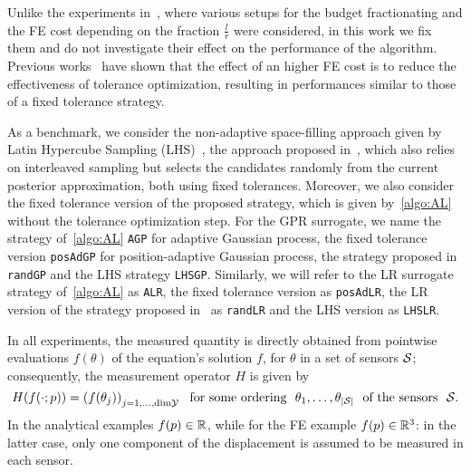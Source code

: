 Unlike the experiments in~\cite{VillaniArconesUngerWeiser2025}, where various setups for the budget fractionating and the FE cost depending on the fraction $\frac{l}{r}$ were considered, in this work we fix them and do not investigate their effect on the performance of the algorithm.
Previous works~\cite{SemlerWeiser2023,VillaniArconesUngerWeiser2025,VillaniUngerWeiser2024} have shown that the effect of an higher FE cost is to reduce the effectiveness of tolerance optimization, resulting in performances similar to those of a fixed tolerance strategy.

As a benchmark, we consider the non-adaptive space-filling approach given by Latin Hypercube Sampling (LHS)~\cite{McKayBeckmanConover1979}, the approach proposed in~\cite{Dinkel2024}, which also relies on interleaved sampling but selects the candidates randomly from the current posterior approximation, both using fixed tolerances.
Moreover, we also consider the fixed tolerance version of the proposed strategy, which is given by~\ref{algo:AL} without the tolerance optimization step. 
For the GPR surrogate, we name the strategy of~\ref{algo:AL} \texttt{AGP} for adaptive Gaussian process, the fixed tolerance version \texttt{posAdGP} for position-adaptive Gaussian process, the strategy proposed in~\cite{Dinkel2024} \texttt{randGP} and the LHS strategy \texttt{LHSGP}.
Similarly, we will refer to the LR surrogate strategy of~\ref{algo:AL} as \texttt{ALR}, the fixed tolerance version as \texttt{posAdLR}, the LR version of the strategy proposed in~\cite{Dinkel2024} as \texttt{randLR} and the LHS version as \texttt{LHSLR}. \medskip

In all experiments, the measured quantity is directly obtained from pointwise evaluations $f(\theta)$ of the equation's solution $f$, for $\theta$ in a set of sensors $\mathcal S$; consequently, the measurement operator $H$ is given by
\[
    H(f(\cdot; p)) = \left( f(\theta_j)\right)_{j=1,\ldots, \text{dim} \mathcal Y} \ \text{ for some ordering } \ \theta_1, \ldots, \theta_{|\mathcal S|} \ \text{ of the sensors } \ \mathcal S.
\]
In the analytical examples $f(p) \in \mathbb{R}$, while for the FE example $f(p)\in \mathbb{R}^3$: in the latter case, only one component of the displacement is assumed to be measured in each sensor. \medskip

